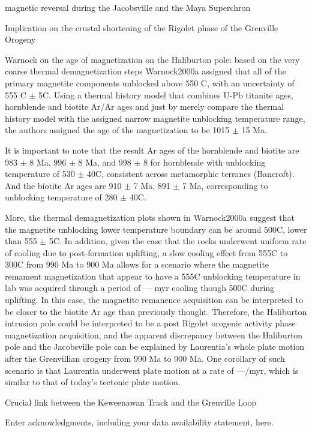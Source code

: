 \documentclass[draft]{agujournal2019}
\begin{document}
magnetic reversal during the Jacobsville and the Maya Superchron

Implication on the crustal shortening of the Rigolet phase of the Grenville Orogeny

Warnock on the age of magnetization on the Haliburton pole: based on the very coarse thermal demagnetization steps Warnock2000a assigned that all of the primary magnetite components unblocked above 550 \textdegree C, with an uncertainty of 555 \textdegree C $\pm$ 5\textdegree C. Using a thermal history model that combines U-Pb titanite ages, hornblende and biotite Ar/Ar ages and just by merely compare the thermal history model with the assigned narrow magnetite unblocking temperature range, the authors assigned the age of the magnetization to be 1015 $\pm$ 15 Ma. 

It is important to note that the result Ar ages of the hornblende and biotite are 983 $\pm$ 8 Ma, 996 $\pm$ 8 Ma, and 998 $\pm$ 8 for hornblende with unblocking temperature of 530 $\pm$ 40\textdegree C, consistent across metamorphic terranes (Bancroft). And the biotite Ar ages are 910 $\pm$ 7 Ma, 891 $\pm$ 7 Ma, corresponding to unblocking temperature of 280 $\pm$ 40\textdegree C. 

More, the thermal demagnetization plots shown in Warnock2000a suggest that the magnetite unblocking lower temperature boundary can be around 500\textdegree C, lower than 555 $\pm$ 5\textdegree C. In addition, given the case that the rocks underwent uniform rate of cooling due to post-formation uplifting, a slow cooling effect from 555\textdegree C to 300\textdegree C from 990 Ma to 900 Ma allows for a scenario where the magnetite remament magnetization that appear to have a 555\textdegree C unblocking temperature in lab was acquired through a period of --- myr cooling though 500\textdegree C during uplifting. In this case, the magnetite remanence acquisition can be interpreted to be closer to the biotite Ar age than previously thought. Therefore, the Haliburton intrusion pole could be interpreted to be a post Rigolet orogenic activity phase magnetization acquisition, and the apparent discrepancy between the Haliburton pole and the Jacobsville pole can be explained by Laurentia's whole plate motion after the Grenvillian orogeny from 990 Ma to 900 Ma. One corollary of such scenario is that Laurentia underwent plate motion at a rate of ---\textdegree/myr, which is similar to that of today's tectonic plate motion. 

Crucial link between the Keweenawan Track and the Grenville Loop



\acknowledgments
Enter acknowledgments, including your data availability statement, here.



\end{document}
